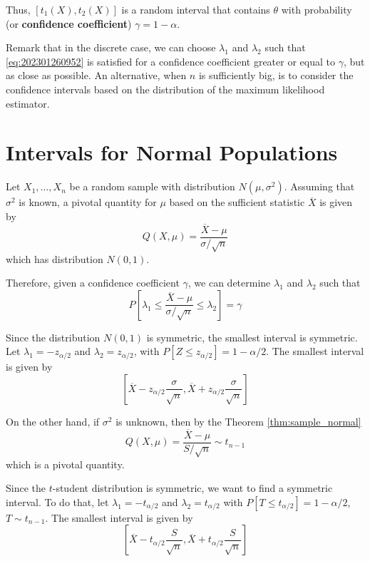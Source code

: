 \documentclass[12pt,a4paper]{report}
\begin{document}
Thus, $[t_1(X), t_2(X)]$ is a random interval that contains $\theta$ with probability (or \textbf{confidence coefficient}) $\gamma = 1 - \alpha$. 

Remark that in the discrete case, we can choose $\lambda_1$ and $\lambda_2$ such that \eqref{eq:202301260952} is satisfied for a confidence coefficient greater or equal to $\gamma$, but as close as possible. An alternative, when $n$ is sufficiently big, is to consider the confidence intervals based on the distribution of the maximum likelihood estimator. 

\section{Intervals for Normal Populations}

Let $X_1, \ldots, X_n$ be a random sample with distribution $N(\mu, \sigma^2)$. Assuming that $\sigma^2$ is known, a pivotal quantity for $\mu$ based on the sufficient statistic $\overline{X}$ is given by 
\[
    Q(X, \mu) = \frac{\overline{X} - \mu}{\sigma / \sqrt{n}}
\]
which has distribution $N(0,1)$. 

Therefore, given a confidence coefficient $\gamma$, we can determine $\lambda_1$ and $\lambda_2$ such that 
\begin{equation*}
    P \left[ \lambda_1 \leq \frac{\overline{X} - \mu}{\sigma / \sqrt{n}} \leq \lambda_2 \right] = \gamma
\end{equation*}

Since the distribution $N(0,1)$ is symmetric, the smallest interval is symmetric. Let $\lambda_1 = -z_{\alpha/2}$ and $\lambda_2 = z_{\alpha/2}$, with $P[Z \leq z_{\alpha/2}] = 1 - \alpha/2$. The smallest interval is given by 
\[
    \left[ \overline{X} - z_{\alpha/2} \frac{\sigma}{\sqrt{n}}, \overline{X} + z_{\alpha/2} \frac{\sigma}{\sqrt{n}} \right]
\]

On the other hand, if $\sigma^2$ is unknown, then by the Theorem \ref{thm:sample_normal}
\[
    Q(X, \mu) = \frac{\overline{X} - \mu}{S / \sqrt{n}} \sim t_{n-1}
\]
which is a pivotal quantity. 

Since the $t$-student distribution is symmetric, we want to find a symmetric interval. To do that, let $\lambda_1 = -t_{\alpha/2}$ and $\lambda_2 = t_{\alpha/2}$ with $P[T \leq t_{\alpha/2}] = 1 - \alpha/2$, $T \sim t_{n-1}$. The smallest interval is given by 
\[
    \left[ \overline{X} - t_{\alpha/2} \frac{S}{\sqrt{n}}, \overline{X} + t_{\alpha/2} \frac{S}{\sqrt{n}} \right]
\]
\end{document}
